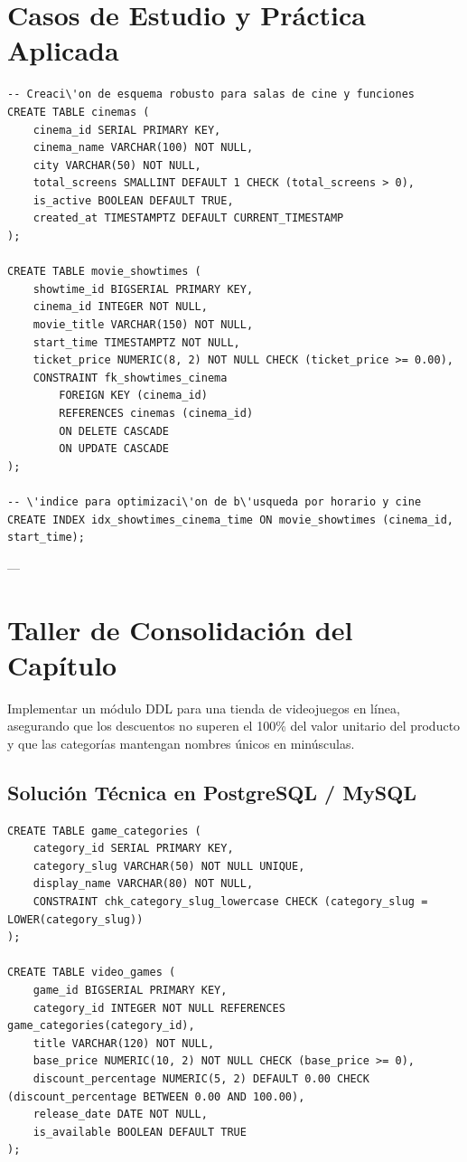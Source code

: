 \section{Casos de Estudio y Pr\'actica Aplicada}

\begin{lstlisting}[style=sqlstyle, caption={Definici\'on DDL con restricciones de integridad completas}]
-- Creaci\'on de esquema robusto para salas de cine y funciones
CREATE TABLE cinemas (
    cinema_id SERIAL PRIMARY KEY,
    cinema_name VARCHAR(100) NOT NULL,
    city VARCHAR(50) NOT NULL,
    total_screens SMALLINT DEFAULT 1 CHECK (total_screens > 0),
    is_active BOOLEAN DEFAULT TRUE,
    created_at TIMESTAMPTZ DEFAULT CURRENT_TIMESTAMP
);

CREATE TABLE movie_showtimes (
    showtime_id BIGSERIAL PRIMARY KEY,
    cinema_id INTEGER NOT NULL,
    movie_title VARCHAR(150) NOT NULL,
    start_time TIMESTAMPTZ NOT NULL,
    ticket_price NUMERIC(8, 2) NOT NULL CHECK (ticket_price >= 0.00),
    CONSTRAINT fk_showtimes_cinema
        FOREIGN KEY (cinema_id)
        REFERENCES cinemas (cinema_id)
        ON DELETE CASCADE
        ON UPDATE CASCADE
);

-- \'indice para optimizaci\'on de b\'usqueda por horario y cine
CREATE INDEX idx_showtimes_cinema_time ON movie_showtimes (cinema_id, start_time);
\end{lstlisting}

---

\section{Taller de Consolidaci\'on del Cap\'itulo}

\begin{businessproblem}
Implementar un m\'odulo DDL para una tienda de videojuegos en l\'inea, asegurando que los descuentos no superen el 100\% del valor unitario del producto y que las categor\'ias mantengan nombres \'unicos en min\'usculas.
\end{businessproblem}

\subsection{Soluci\'on T\'ecnica en PostgreSQL / MySQL}

\begin{lstlisting}[style=sqlstyle, caption={Script DDL con constraints y tipos personalizados}]
CREATE TABLE game_categories (
    category_id SERIAL PRIMARY KEY,
    category_slug VARCHAR(50) NOT NULL UNIQUE,
    display_name VARCHAR(80) NOT NULL,
    CONSTRAINT chk_category_slug_lowercase CHECK (category_slug = LOWER(category_slug))
);

CREATE TABLE video_games (
    game_id BIGSERIAL PRIMARY KEY,
    category_id INTEGER NOT NULL REFERENCES game_categories(category_id),
    title VARCHAR(120) NOT NULL,
    base_price NUMERIC(10, 2) NOT NULL CHECK (base_price >= 0),
    discount_percentage NUMERIC(5, 2) DEFAULT 0.00 CHECK (discount_percentage BETWEEN 0.00 AND 100.00),
    release_date DATE NOT NULL,
    is_available BOOLEAN DEFAULT TRUE
);
\end{lstlisting}


